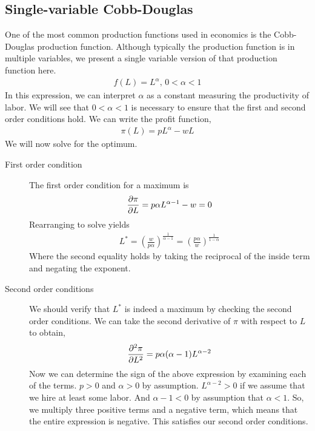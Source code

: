 \subsection*{Single-variable Cobb-Douglas}
One of the most common production functions used in economics is the Cobb-Douglas production function. Although typically the production function is in multiple variables, we present a single variable version of that production function here. 
\begin{align}
    f(L) = L^\alpha, \, 0 < \alpha < 1 
\end{align}
In this expression, we can interpret $\alpha$ as a constant measuring the productivity of labor. We will see that $0 < \alpha < 1$ is necessary to ensure that the first and second order conditions hold. We can write the profit function,
\begin{align}
    \pi(L) = p L^\alpha - w L
\end{align}
We will now solve for the optimum.
\begin{description}
    \item[First order condition] The first order condition for a maximum is
    \begin{align}
        \frac{\partial \pi}{\partial L} = p \alpha L^{\alpha - 1} - w = 0
    \end{align} 
    Rearranging to solve yields
    \begin{align}
        L^* = \left(\frac{w}{p \alpha}\right)^{\frac{1}{\alpha - 1}} = \left(\frac{p \alpha}{w}\right)^{\frac{1}{1 - \alpha}} \label{eq:cobb_douglas_optimized}
    \end{align}
    Where the second equality holds by taking the reciprocal of the inside term and negating the exponent. 
    \item[Second order conditions] We should verify that $L^*$ is indeed a maximum by checking the second order conditions. We can take the second derivative of $\pi$ with respect to $L$ to obtain,
    \begin{align}
        \frac{\partial ^2 \pi}{\partial L^2} = p \alpha (\alpha - 1) L^{\alpha - 2}
    \end{align}
    Now we can determine the sign of the above expression by examining each of the terms. $p > 0$ and $\alpha > 0$ by assumption. $L^{\alpha - 2} > 0$ if we assume that we hire at least some labor. And $\alpha - 1 < 0$ by assumption that $\alpha < 1$. So, we multiply three positive terms and a negative term, which means that the entire expression is negative. This satisfies our second order conditions. 
\end{description}

